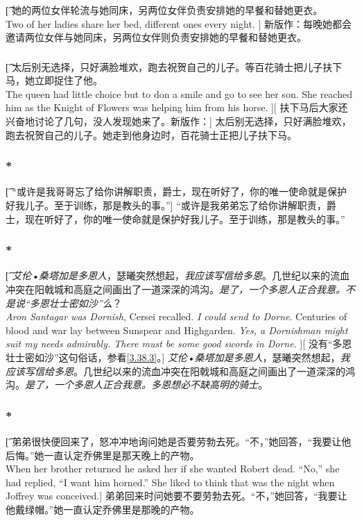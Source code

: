 \documentclass[12pt,a4paper]{article}
\begin{document}
\subsubsection{}\t[
	她的两位女伴轮流与她同床，另两位女伴负责安排她的早餐和替她更衣。\\
	Two of her ladies share her bed, different ones every night. ]
	新版作：每晚她都会邀请两位女伴与她同床，另两位女伴则负责安排她的早餐和替她更衣。
	
\subsubsection{}\t[
	 太后别无选择，只好满脸堆欢，跑去祝贺自己的儿子。等百花骑士把儿子扶下马，她立即捉住了他。\\
	 The queen had little choice but to don a smile and go to see her son. She reached him as the Knight of Flowers was helping him from his horse. ][
	 扶下马后大家还兴奋地讨论了几句，没人发现她来了。新版作：]
	 太后别无选择，只好满脸堆欢，跑去祝贺自己的儿子。她走到他身边时，百花骑士正把儿子扶下马。
	 
\subsubsection{\color{red}*}\t[
	“或许是我哥哥忘了给你讲解职责，爵士，现在听好了，你的唯一使命就是保护好我儿子。至于训练，那是教头的事。”]
	“或许是我弟弟忘了给你讲解职责，爵士，现在听好了，你的唯一使命就是保护好我儿子。至于训练，那是教头的事。”

\subsubsection{\color{red}*}\t[
	\emph{艾伦•桑塔加是多恩人}，瑟曦突然想起，\emph{我应该写信给多恩}。几世纪以来的流血冲突在阳戟城和高庭之间画出了一道深深的鸿沟。\emph{是了，一个多恩人正合我意。不是说“多恩壮士密如沙”么}？\\
	\emph{Aron Santagar was Dornish}, Cersei recalled. \emph{I could send to Dorne}. Centuries of blood and war lay between Sunspear and Highgarden. \emph{Yes, a Dornishman might suit my needs admirably. There must be some good swords in Dorne}. ][
	没有“多恩壮士密如沙”这句俗话，参看\ref{3.38.3}。]
	\emph{艾伦•桑塔加是多恩人}，瑟曦突然想起，\emph{我应该写信给多恩}。几世纪以来的流血冲突在阳戟城和高庭之间画出了一道深深的鸿沟。\emph{是了，一个多恩人正合我意。多恩想必不缺高明的骑士}。
	
\subsubsection{\color{red}*}\t[	
	弟弟很快便回来了，怒冲冲地询问她是否要劳勃去死。“不，”她回答，“我要让他后悔。”她一直认定乔佛里是那天晚上的产物。\\
	When her brother returned he asked her if she wanted Robert dead. “No,” she had replied, “I want him horned.” She liked to think that was the night when Joffrey was conceived.]
	弟弟回来时问她要不要劳勃去死。“不，”她回答，“我要让他戴绿帽。”她一直认定乔佛里是那晚的产物。
	
\end{document}
